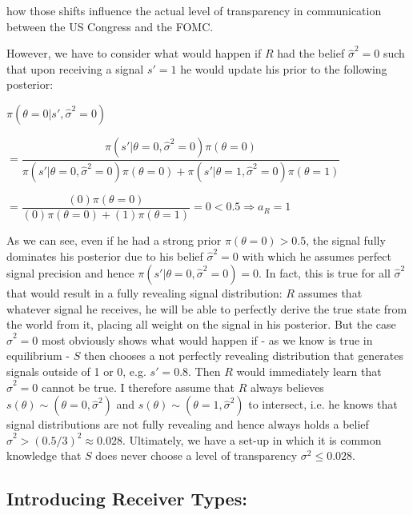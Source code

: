 \documentclass[paper=a4,12pt,DIV=11,twoside=false]{scrartcl}
\begin{document}
how those shifts influence the actual level of transparency in communication between the US Congress and the FOMC. 

\noindent However, we have to consider what would happen if $R$ had the belief $\hat{\sigma}^2 = 0$ such that upon receiving a signal $s'=1$ he would update his prior to the following posterior:

\begin{center}
$\pi(\theta = 0|s',\hat{\sigma}^2=0)$ 
\end{center}

\begin{center}
$= \dfrac{\pi(s' | \theta = 0,\hat{\sigma}^2=0)\pi(\theta = 0)}{\pi(s' | \theta = 0,\hat{\sigma}^2=0)\pi(\theta = 0) + \pi(s'| \theta = 1,\hat{\sigma}^2=0)\pi(\theta = 1)}$
\end{center}

\begin{center}
$=\dfrac{(0)\pi(\theta = 0)}{(0)\pi(\theta = 0)+(1)\pi(\theta = 1)} = 0 < 0.5 \Rightarrow a_{R}=1$
\end{center}

\noindent As we can see, even if he had a strong prior $\pi(\theta = 0)>0.5$, the signal fully dominates his posterior due to his belief $\hat{\sigma}^2 = 0$ with which he assumes perfect signal precision and hence $\pi(s' | \theta = 0,\hat{\sigma}^2=0)=0$. In fact, this is true for all $\hat{\sigma}^2$ that would result in a fully revealing signal distribution: $R$ assumes that whatever signal he receives, he will be able to perfectly derive the true state from the world from it, placing all weight on the signal in his posterior. But the case $\hat{\sigma}^2 = 0$ most obviously shows what would happen if - as we know is true in equilibrium - $S$ then chooses a not perfectly revealing distribution that generates signals outside of 1 or 0, e.g. $s'=0.8$. Then $R$ would immediately learn that $\hat{\sigma}^2=0$ cannot be true. I therefore assume that $R$ always believes $s(\theta)\sim(\theta=0, \hat{\sigma}^2)$ and $s(\theta)\sim(\theta=1, \hat{\sigma}^2)$ to intersect, i.e. he knows that signal distributions are not fully revealing and hence always holds a belief $\hat{\sigma}^2 > (0.5/3)^2 \approx 0.028$. Ultimately, we have a set-up in which it is common knowledge that $S$ does never choose a level of transparency $\sigma^2 \leq 0.028$.

\subsection{Introducing Receiver Types:}
\end{document}
